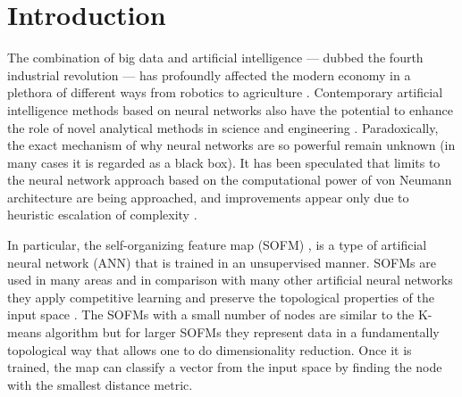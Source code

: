 \documentclass[pra,showkeys,twocolumn,showpacs]{revtex4-1}
\begin{document}
\maketitle



\section{Introduction}
The combination of big data and artificial intelligence ---  dubbed the fourth industrial revolution --- has profoundly affected the modern economy in a plethora of different ways from robotics to agriculture \cite{Lecun2015, ghahramani2015,schwab2017,esteva2019, tyrsa2017}. Contemporary artificial intelligence methods based on neural networks also have the potential to enhance the role of novel analytical methods in science and engineering \cite{kaggle2014, radovic2018, butler2018, radovic2018}. Paradoxically, the exact mechanism of why neural networks are so powerful remain unknown (in many cases it is regarded as a black box).  It has been speculated that limits to the neural network approach based on the computational power of von Neumann architecture are being approached, and improvements appear only due to heuristic escalation of complexity \cite{marcus2018,sze2017,kourtis2020}.

In particular, the self-organizing feature map (SOFM) \cite{kohonen1990,kohonen1996,kohonen1997}, is a type of artificial neural network (ANN) that is trained in an unsupervised manner. SOFMs are used in many areas \cite{vilibic2016, guido1998, doszkocs1990, jones2012,mori2019,corsello2017,zhu2018,chea2016} and in comparison with many other artificial neural networks they apply competitive learning and preserve the topological properties of the input space \cite{kiviluotoa1996}. The SOFMs with a small number of nodes are similar to the K-means algorithm but for larger SOFMs they represent data in a fundamentally topological way that allows one to do dimensionality reduction.  Once it is trained, the map can classify a vector from the input space by finding the node with the smallest distance metric. 
\end{document}
